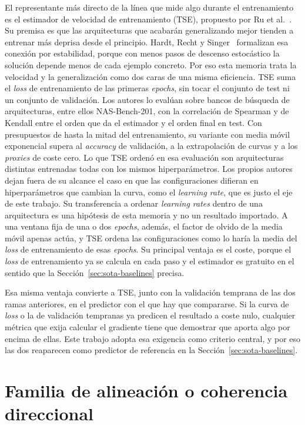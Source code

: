 El representante más directo de la línea que mide algo durante el entrenamiento es el estimador de velocidad de entrenamiento (TSE), propuesto por Ru et al.~\cite{ru2021speedy}. Su premisa es que las arquitecturas que acabarán generalizando mejor tienden a entrenar más deprisa desde el principio. Hardt, Recht y Singer~\cite{hardt2016train} formalizan esa conexión por estabilidad, porque con menos pasos de descenso estocástico la solución depende menos de cada ejemplo concreto. Por eso esta memoria trata la velocidad y la generalización como dos caras de una misma eficiencia. TSE suma el \emph{loss} de entrenamiento de las primeras \emph{epochs}, sin tocar el conjunto de test ni un conjunto de validación. Los autores lo evalúan sobre bancos de búsqueda de arquitecturas, entre ellos NAS-Bench-201, con la correlación de Spearman y de Kendall entre el orden que da el estimador y el orden final en test. Con presupuestos de hasta la mitad del entrenamiento, su variante con media móvil exponencial supera al \emph{accuracy} de validación, a la extrapolación de curvas y a los \emph{proxies} de coste cero. Lo que TSE ordenó en esa evaluación son arquitecturas distintas entrenadas todas con los mismos hiperparámetros. Los propios autores dejan fuera de su alcance el caso en que las configuraciones difieran en hiperparámetros que cambian la curva, como el \emph{learning rate}, que es justo el eje de este trabajo. Su transferencia a ordenar \emph{learning rates} dentro de una arquitectura es una hipótesis de esta memoria y no un resultado importado. A una ventana fija de una o dos \emph{epochs}, además, el factor de olvido de la media móvil apenas actúa, y TSE ordena las configuraciones como lo haría la media del \emph{loss} de entrenamiento de esas \emph{epochs}. Su principal ventaja es el coste, porque el \emph{loss} de entrenamiento ya se calcula en cada paso y el estimador es gratuito en el sentido que la Sección~\ref{sec:sota-baselines} precisa.

Esa misma ventaja convierte a TSE, junto con la validación temprana de las dos ramas anteriores, en el predictor con el que hay que compararse. Si la curva de \emph{loss} o la de validación tempranas ya predicen el resultado a coste nulo, cualquier métrica que exija calcular el gradiente tiene que demostrar que aporta algo por encima de ellas. Este trabajo adopta esa exigencia como criterio central, y por eso las dos reaparecen como predictor de referencia en la Sección~\ref{sec:sota-baselines}.

\section{Familia de alineación o coherencia direccional}
\label{sec:sota-alineacion}

